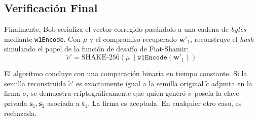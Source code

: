 \documentclass[11pt, a4paper]{report}
\theoremstyle{definition}
\begin{document}
\subsection{Verificación Final}

Finalmente, Bob serializa el vector corregido pasándolo a una cadena de \textit{bytes} mediante \texttt{w1Encode}. Con $\mu$ y el compromiso recuperado $\mathbf{w}'_1$, reconstruye el \textit{hash} simulando el papel de la función de desafío de Fiat-Shamir:
\begin{equation}
    \tilde{c}' = \text{SHAKE-256}(\mu \parallel \texttt{w1Encode}(\mathbf{w}'_1))
\end{equation}

El algoritmo concluye con una comparación binaria en tiempo constante. Si la semilla reconstruida $\tilde{c}'$ es exactamente igual a la semilla original $\tilde{c}$ adjunta en la firma $\sigma$, se demuestra criptográficamente que quien generó $\sigma$ poseía la clave privada $\mathbf{s}_1, \mathbf{s}_2$ asociada a $\mathbf{t}_1$. La firma es aceptada. En cualquier otro caso, es rechazada.
\end{document}
